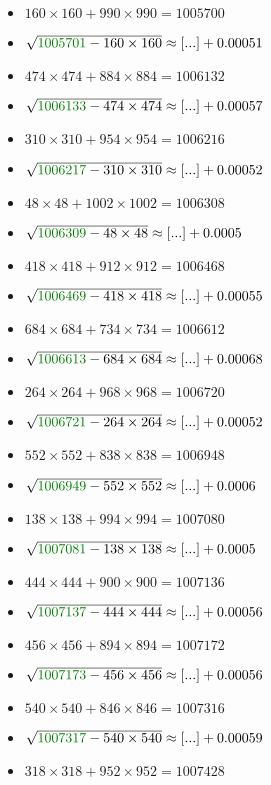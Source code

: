 \documentclass[12pt]{article}
\begin{document}
\begin{multicols}{2}
\begin{itemize}
\item $160\times160 + 990\times990 = 1005700$
\item $\sqrt{ {\color{green!50!black}{1005701}} - 160\times 160 } \approx [...] + 0.00051$
\item $474\times474 + 884\times884 = 1006132$
\item $\sqrt{ {\color{green!50!black}{1006133}} - 474\times 474 } \approx [...] + 0.00057$
\item $310\times310 + 954\times954 = 1006216$
\item $\sqrt{ {\color{green!50!black}{1006217}} - 310\times 310 } \approx [...] + 0.00052$
\item $48\times48 + 1002\times1002 = 1006308$
\item $\sqrt{ {\color{green!50!black}{1006309}} - 48\times 48 } \approx [...] + 0.0005$
\item $418\times418 + 912\times912 = 1006468$
\item $\sqrt{ {\color{green!50!black}{1006469}} - 418\times 418 } \approx [...] + 0.00055$
\item $684\times684 + 734\times734 = 1006612$
\item $\sqrt{ {\color{green!50!black}{1006613}} - 684\times 684 } \approx [...] + 0.00068$
\item $264\times264 + 968\times968 = 1006720$
\item $\sqrt{ {\color{green!50!black}{1006721}} - 264\times 264 } \approx [...] + 0.00052$
\item $552\times552 + 838\times838 = 1006948$
\item $\sqrt{ {\color{green!50!black}{1006949}} - 552\times 552 } \approx [...] + 0.0006$
\item $138\times138 + 994\times994 = 1007080$
\item $\sqrt{ {\color{green!50!black}{1007081}} - 138\times 138 } \approx [...] + 0.0005$
\item $444\times444 + 900\times900 = 1007136$
\item $\sqrt{ {\color{green!50!black}{1007137}} - 444\times 444 } \approx [...] + 0.00056$
\item $456\times456 + 894\times894 = 1007172$
\item $\sqrt{ {\color{green!50!black}{1007173}} - 456\times 456 } \approx [...] + 0.00056$
\item $540\times540 + 846\times846 = 1007316$
\item $\sqrt{ {\color{green!50!black}{1007317}} - 540\times 540 } \approx [...] + 0.00059$
\item $318\times318 + 952\times952 = 1007428$

\end{itemize}
\end{multicols}
\end{document}
